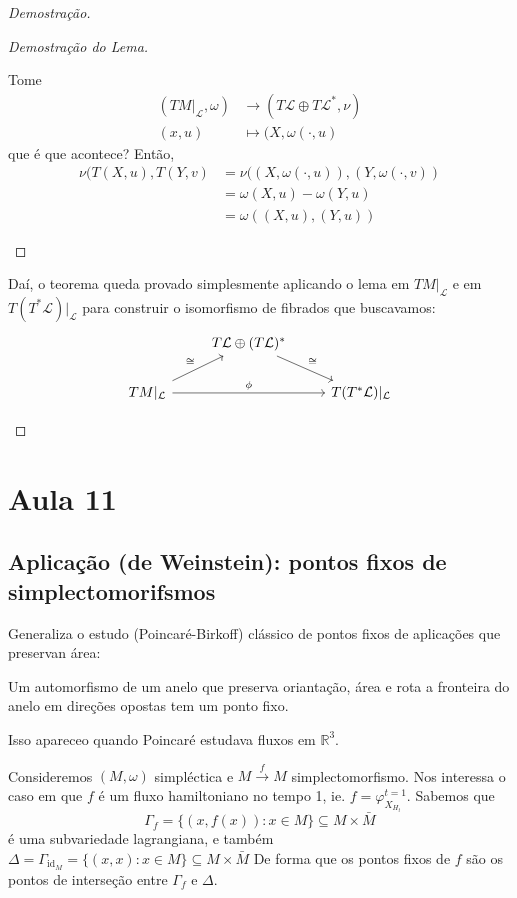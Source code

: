 \begin{proof}[Demostra\c c\~ao]
\begin{lemma}
\begin{enumerate}
\begin{proof}[Demostra\c c\~ao do Lema]
\begin{enumerate}[label=\textbf{Step \arabic*}]
Tome 
\begin{align*}
	(TM|_{\mathcal{L}},\omega)  &\longrightarrow (T\mathcal{L}\oplus T\mathcal{L}^*,\nu) \\
	(x,u) &\longmapsto (X,\omega(\cdot ,u)
\end{align*}
que \'e que acontece? Ent\~ao,
\begin{align*}
	\nu(T(X,u),T(Y,v)&=\nu((X,\omega(\cdot ,u)),(Y,\omega(\cdot ,v))\\
	&=\omega(X,u)-\omega(Y,u)\\
	&=\omega((X,u),(Y,u))
\end{align*}
				\end{enumerate}
			\end{proof}
	\end{enumerate}
	Da\'i, o teorema queda provado simplesmente aplicando o lema em $TM|_{\mathcal{L}}$ e em $T(T^*\mathcal{L})|_{\mathcal{L}}$ para construir o isomorfismo de fibrados que buscavamos:
	\[\begin{tikzcd}
	&T\mathcal{L}\oplus (T\mathcal{L})^*\arrow[dr,"\cong "]\\
	TM|_{\mathcal{L}}\arrow[rr,"\phi"]\arrow[ur,"\cong "]&&T(T^*\mathcal{L})|_{\mathcal{L}}
	\end{tikzcd}\]
\end{lemma}
\end{proof}



\section{Aula 11}

\subsection{Aplica\c c\~ao (de Weinstein): pontos fixos de simplectomorifsmos}

Generaliza o estudo (Poincar\'e-Birkoff) cl\'assico de pontos fixos de aplica\c c\~oes que preservan \'area:

\begin{thm}\leavevmode
	Um automorfismo de um anelo que preserva orianta\c c\~ao, \'area e rota a fronteira do anelo em dire\c c\~oes opostas tem um ponto fixo.
\end{thm}

Isso apareceo quando Poincar\'e estudava fluxos em $\mathbb{R}^{3}$.

Consideremos $(M,\omega)$ simpl\'ectica e $M \overset{f}{\longrightarrow}M$ simplectomorfismo. Nos interessa o caso em que $f$ \'e um fluxo hamiltoniano no tempo 1, ie. $f=\varphi^{t=1}_{X_{H_t}}$. Sabemos que
\[\Gamma_f=\{(x,f(x)):x\in M\} \subseteq M\times \bar{M} \]
\'e uma subvariedade lagrangiana, e tamb\'em
$\Delta =\Gamma_{\operatorname{id}_M}=\{(x,x):x\in M\} \subseteq M\times \bar{M}$ 
De forma que os pontos fixos de $f$ s\~ao os pontos de interse\c c\~ao entre $\Gamma_f$ e $\Delta$.

